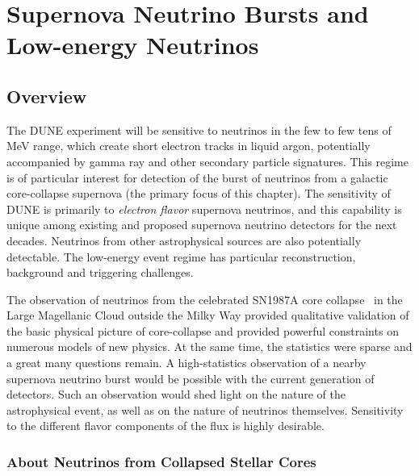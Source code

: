 \chapter{Supernova Neutrino Bursts and Low-energy Neutrinos}
\label{ch:physics-snblowe}

\section{Overview}
\label{sec:physics-snblowe-overview}

The DUNE experiment will be sensitive to neutrinos in the few to few
tens of MeV range, which create short electron tracks in liquid argon, potentially accompanied by
gamma ray and other secondary particle signatures.   This regime is of
particular interest for detection of the burst of neutrinos from a galactic
core-collapse supernova (the primary focus of this chapter). 
The sensitivity of DUNE is primarily to \textit{electron flavor} supernova neutrinos, and this capability is unique among existing and proposed supernova neutrino detectors for the next decades.  
Neutrinos from other astrophysical sources are also potentially detectable.  
The low-energy event regime has particular reconstruction, background and triggering challenges. 

The observation of neutrinos from the celebrated SN1987A core
collapse~\cite{Bionta:1987qt,Hirata:1987hu} in the Large Magellanic
Cloud outside the Milky Way %
provided qualitative validation of the basic physical picture of core-collapse and provided powerful constraints on numerous models of new physics. At the same time, the statistics were sparse 
and a great many questions remain.  A high-statistics observation of a
nearby supernova neutrino burst would be possible with the current
generation of detectors. Such an observation would shed light on 
the nature of the astrophysical event, as well as on the nature of
neutrinos themselves.  Sensitivity to the different flavor components
of the flux is highly desirable.

\subsection{About Neutrinos from Collapsed Stellar Cores}



